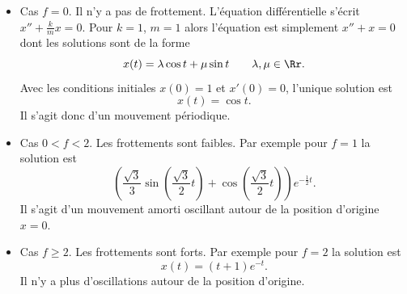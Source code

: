 \documentclass[class=report,crop=false]{standalone}
\begin{document}
\begin{itemize}
  \item Cas $f=0$. Il n'y a pas de frottement. L'équation différentielle s'écrit
  $x''+ \frac{k}{m} x = 0$. Pour $k=1$, $m=1$ alors l'équation est simplement 
  $x''+ x = 0$ dont les solutions sont de la forme
  $$x(t) = \lambda \cos t + \mu \sin t \qquad \lambda,\mu \in\Rr.$$
  Avec les conditions initiales $x(0)=1$ et $x'(0)=0$, l'unique solution est 
  $$x(t) = \cos t.$$
  Il s'agit donc d'un mouvement périodique.
  
  \item Cas $0 < f < 2$. Les frottements sont faibles.
  Par exemple pour $f=1$ la solution est 
  $$\left(\frac{\sqrt{3}}{3} \sin\left(\frac{\sqrt{3}}{2} t\right) + 
   \cos\left(\frac{\sqrt{3}}{2} t\right)\right)
  e^{-\frac{1}{2} t}. $$
  Il s'agit d'un mouvement amorti oscillant autour de la position d'origine $x=0$.
  
  \item Cas $f \ge 2$. Les frottements sont forts. 
  Par exemple pour $f=2$ la solution est
  $$x(t) = (t + 1)e^{-t}.$$
  Il n'y a plus d'oscillations autour de la position d'origine.
\end{itemize}


\finchapitre
\end{document}
